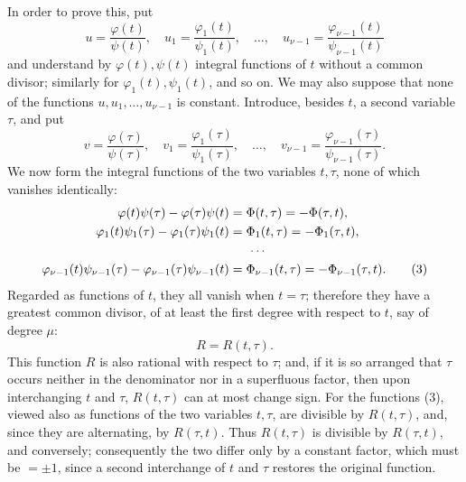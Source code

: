 \documentclass[11pt]{article}
\begin{document}
In order to prove this, put
\begin{equation}
u=\frac{\varphi(t)}{\psi(t)},\quad
u_1=\frac{\varphi_1(t)}{\psi_1(t)},\quad\ldots,\quad
u_{\nu-1}=\frac{\varphi_{\nu-1}(t)}{\psi_{\nu-1}(t)}
\tag{1}
\end{equation}
and understand by \(\varphi(t),\psi(t)\) integral functions of \(t\) without a common divisor; similarly for \(\varphi_1(t),\psi_1(t)\), and so on. We may also suppose that none of the functions \(u,u_1,\ldots,u_{\nu-1}\) is constant. Introduce, besides \(t\), a second variable \(\tau\), and put
\begin{equation}
v=\frac{\varphi(\tau)}{\psi(\tau)},\quad
v_1=\frac{\varphi_1(\tau)}{\psi_1(\tau)},\quad\ldots,\quad
v_{\nu-1}=\frac{\varphi_{\nu-1}(\tau)}{\psi_{\nu-1}(\tau)}.
\tag{2}
\end{equation}
We now form the integral functions of the two variables \(t,\tau\), none of which vanishes identically:
\begin{align}
\varphi(t)\psi(\tau)-\varphi(\tau)\psi(t)
&=\Phi(t,\tau)=-\Phi(\tau,t),\notag\\
\varphi_1(t)\psi_1(\tau)-\varphi_1(\tau)\psi_1(t)
&=\Phi_1(t,\tau)=-\Phi_1(\tau,t),\notag\\
&\hspace{1.5em}\cdots\notag\\
\varphi_{\nu-1}(t)\psi_{\nu-1}(\tau)-\varphi_{\nu-1}(\tau)\psi_{\nu-1}(t)
&=\Phi_{\nu-1}(t,\tau)=-\Phi_{\nu-1}(\tau,t).
\tag{3}
\end{align}
Regarded as functions of \(t\), they all vanish when \(t=\tau\); therefore they have a greatest common divisor, of at least the first degree with respect to \(t\), say of degree \(\mu\):
\begin{equation}
R=R(t,\tau).
\tag{4}
\end{equation}
This function \(R\) is also rational with respect to \(\tau\); and, if it is so arranged that \(\tau\) occurs neither in the denominator nor in a superfluous factor, then upon interchanging \(t\) and \(\tau\), \(R(t,\tau)\) can at most change sign. For the functions (3), viewed also as functions of the two variables \(t,\tau\), are divisible by \(R(t,\tau)\), and, since they are alternating, by \(R(\tau,t)\). Thus \(R(t,\tau)\) is divisible by \(R(\tau,t)\), and conversely; consequently the two differ only by a constant factor, which must be \(=\pm1\), since a second interchange of \(t\) and \(\tau\) restores the original function.
\end{document}
